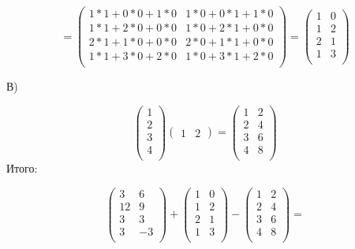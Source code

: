 \documentclass[a4paper]{article}
\begin{document}
\begin{equation*}
=
\begin{pmatrix}
 1*1 +0*0 +1*0& 1*0 +0*1 +1*0\\
1*1 +2 *0 +0*0&1*0 +2*1 +0*0\\
2*1 +1*0 +0*0&2*0 +1*1 +0*0\\
1*1 +3*0 +2*0&1*0 +3*1 +2*0\\
\end{pmatrix}=
\begin{pmatrix}
  1&0\\
1&2\\
2&1\\
1&3\\
\end{pmatrix}
\end{equation*} 


В)

\begin{equation*}
\begin{pmatrix}
 1\\
2\\
3\\
4\\
\end{pmatrix}
\begin{pmatrix}
1&2
\end{pmatrix} = 
\begin{pmatrix}
1 &2\\
2&4\\
3&6\\
4&8\\
\end{pmatrix}
\end{equation*}
Итого:

\begin{equation*}
\begin{pmatrix}
3 &6\\
12&9\\
3&3\\
3&-3\\
\end{pmatrix}+
\begin{pmatrix}
  1&0\\
1&2\\
2&1\\
1&3\\
\end{pmatrix}-
\begin{pmatrix}
1 &2\\
2&4\\
3&6\\
4&8\\
\end{pmatrix}=
\end{equation*}
\end{document}
